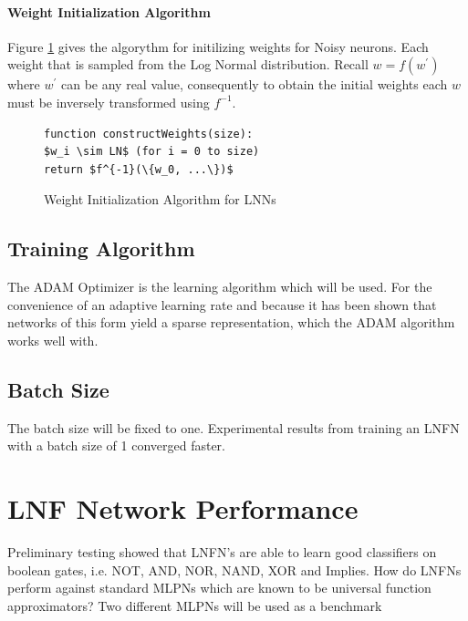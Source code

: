 \noindent
\begin{minipage}[t]{0.48\textwidth}
\vspace{0px}
\paragraph{Weight Initialization Algorithm}
Figure \ref{alg:lnn-initlization} gives the algorythm for initilizing weights for Noisy neurons. Each weight that is sampled from the Log Normal distribution. Recall $w = f(w^{'})$ where $w^{'}$ can be any real value, consequently to obtain the initial weights each $w$ must be inversely transformed using $f^{-1}$.
\end{minipage}
\hspace{0.05\textwidth}
\begin{minipage}[t]{0.47\textwidth}
\vspace{0px}
\begin{figure}[H]
	\begin{lstlisting}[mathescape=true]
function constructWeights(size):
$w_i \sim LN$ (for i = 0 to size)
return $f^{-1}(\{w_0, ...\})$
\end{lstlisting}
	\caption{Weight Initialization Algorithm for LNNs}
	\label{alg:lnn-initlization}
\end{figure}
\end{minipage}

\subsection{Training Algorithm}
The ADAM Optimizer \cite{kingma2014adam} is the learning algorithm which will be used. For the convenience of an adaptive learning rate and because it has been shown that networks of this form yield a sparse representation, which the ADAM algorithm works well with.

\subsection{Batch Size}
The batch size will be fixed to one. Experimental results from training an LNFN with a batch size of 1 converged faster. 

\section{LNF Network Performance}
Preliminary testing showed that LNFN's are able to learn good classifiers on boolean gates, i.e. NOT, AND, NOR, NAND, XOR and Implies. How do LNFNs perform against standard MLPNs which are known to be universal function approximators? Two different MLPNs will be used as a benchmark

